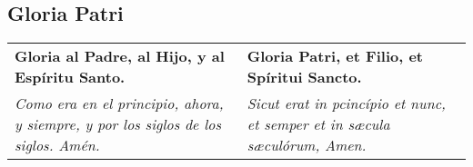 \documentclass[./devocionario.tex]{subfiles}
\begin{document}
    \subsection*{Gloria Patri}
    \begin{longtable} { p{} p{} }
        \textbf{Gloria al Padre, al Hijo, y al Espíritu Santo.} 
        
        &

        \textbf{Gloria Patri, et Filio, et Spíritui Sancto.}\\
        
        \textit{Como era en el principio, ahora, y siempre, y por los siglos de los siglos. Amén.}
        
        &

        \textit{Sicut erat in pcincípio et nunc, et semper et in sæcula sæculórum, Amen.}
    \end{longtable}
\end{document}
